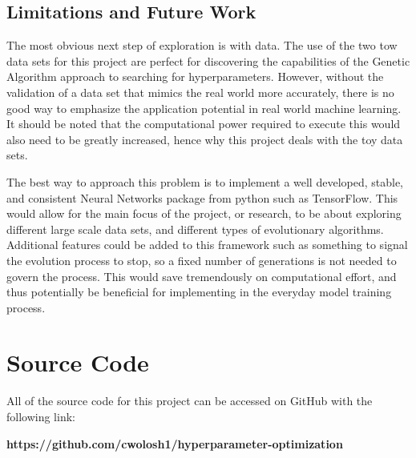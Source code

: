 \documentclass[12pt]{report}
\begin{document}
\section{Limitations and Future Work}

The most obvious next step of exploration is with data. The use of the two tow data sets for this project are perfect for discovering the capabilities of the Genetic Algorithm approach to searching for hyperparameters. However, without the validation of a data set that mimics the real world more accurately, there is no good way to emphasize the application potential in real world machine learning. It should be noted that the computational power required to execute this would also need to be greatly increased, hence why this project deals with the toy data sets.

The best way to approach this problem is to implement a well developed, stable, and consistent Neural Networks package from python such as TensorFlow. This would allow for the main focus of the project, or research, to be about exploring different large scale data sets, and different types of evolutionary algorithms. Additional features could be added to this framework such as something to signal the evolution process to stop, so a fixed number of generations is not needed to govern the process. This would save tremendously on computational effort, and thus potentially be beneficial for implementing in the everyday model training process.

\appendix
\chapter{Source Code}
All of the source code for this project can be accessed on GitHub with the following link:
\begin{center}
\bf{https://github.com/cwolosh1/hyperparameter-optimization}
\end{center}



\end{document}
